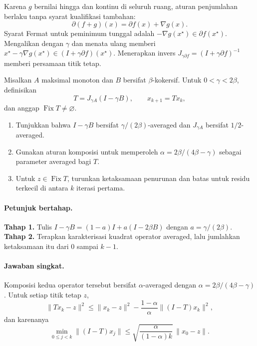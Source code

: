 Karena $g$ bernilai hingga dan kontinu di seluruh ruang, aturan penjumlahan
berlaku tanpa syarat kualifikasi tambahan:
\[
 \partial(f+g)(x)=\partial f(x)+\nabla g(x).
\]
Syarat Fermat untuk peminimum tunggal adalah
$-\nabla g(x^\star)\in\partial f(x^\star)$. Mengalikan dengan $\gamma$ dan
menata ulang memberi
$x^\star-\gamma\nabla g(x^\star)\in(I+\gamma\partial f)(x^\star)$.
Menerapkan invers $J_{\gamma\partial f}=(I+\gamma\partial f)^{-1}$ memberi
persamaan titik tetap.

\begin{exercise}
\label{orig03:ps05:exercise:0002}
Misalkan $A$ maksimal monoton dan $B$ bersifat $\beta$-kokersif. Untuk
$0<\gamma<2\beta$, definisikan
\[
 T=J_{\gamma A}(I-\gamma B),
 \qquad x_{k+1}=Tx_k,
\]
dan anggap $\operatorname{Fix}T\ne\varnothing$.

\begin{enumerate}
  \item Tunjukkan bahwa $I-\gamma B$ bersifat
  $\gamma/(2\beta)$-averaged dan $J_{\gamma A}$ bersifat $1/2$-averaged.
  \item Gunakan aturan komposisi untuk memperoleh
  $\alpha=2\beta/(4\beta-\gamma)$ sebagai parameter averaged bagi $T$.
  \item Untuk $z\in\operatorname{Fix}T$, turunkan ketaksamaan penurunan dan
  batas untuk residu terkecil di antara $k$ iterasi pertama.
\end{enumerate}
\end{exercise}

\paragraph{Petunjuk bertahap.}
\label{orig03:ps05:hint:0002}
\textbf{Tahap 1.} Tulis $I-\gamma B=(1-a)I+a(I-2\beta B)$ dengan
$a=\gamma/(2\beta)$.
\textbf{Tahap 2.} Terapkan karakterisasi kuadrat operator averaged, lalu
jumlahkan ketaksamaan itu dari $0$ sampai $k-1$.

\paragraph{Jawaban singkat.}
\label{orig03:ps05:answer:0002}
Komposisi kedua operator tersebut bersifat
$\alpha$-averaged dengan
$\alpha=2\beta/(4\beta-\gamma)$. Untuk setiap titik tetap $z$,
\[
 \lVert Tx_k-z\rVert^2
 \le\lVert x_k-z\rVert^2
 -\frac{1-\alpha}{\alpha}\lVert(I-T)x_k\rVert^2,
\]
dan karenanya
\[
 \min_{0\le j<k}\lVert(I-T)x_j\rVert
 \le\sqrt{\frac{\alpha}{(1-\alpha)k}}\,\lVert x_0-z\rVert.
\]

